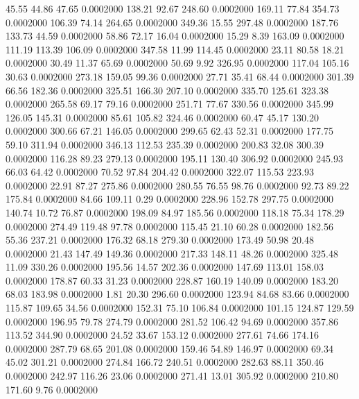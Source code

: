   45.55   44.86   47.65   0.0002000
 138.21   92.67  248.60   0.0002000
 169.11   77.84  354.73   0.0002000
 106.39   74.14  264.65   0.0002000
 349.36   15.55  297.48   0.0002000
 187.76  133.73   44.59   0.0002000
  58.86   72.17   16.04   0.0002000
  15.29    8.39  163.09   0.0002000
 111.19  113.39  106.09   0.0002000
 347.58   11.99  114.45   0.0002000
  23.11   80.58   18.21   0.0002000
  30.49   11.37   65.69   0.0002000
  50.69    9.92  326.95   0.0002000
 117.04  105.16   30.63   0.0002000
 273.18  159.05   99.36   0.0002000
  27.71   35.41   68.44   0.0002000
 301.39   66.56  182.36   0.0002000
 325.51  166.30  207.10   0.0002000
 335.70  125.61  323.38   0.0002000
 265.58   69.17   79.16   0.0002000
 251.71   77.67  330.56   0.0002000
 345.99  126.05  145.31   0.0002000
  85.61  105.82  324.46   0.0002000
  60.47   45.17  130.20   0.0002000
 300.66   67.21  146.05   0.0002000
 299.65   62.43   52.31   0.0002000
 177.75   59.10  311.94   0.0002000
 346.13  112.53  235.39   0.0002000
 200.83   32.08  300.39   0.0002000
 116.28   89.23  279.13   0.0002000
 195.11  130.40  306.92   0.0002000
 245.93   66.03   64.42   0.0002000
  70.52   97.84  204.42   0.0002000
 322.07  115.53  223.93   0.0002000
  22.91   87.27  275.86   0.0002000
 280.55   76.55   98.76   0.0002000
  92.73   89.22  175.84   0.0002000
  84.66  109.11    0.29   0.0002000
 228.96  152.78  297.75   0.0002000
 140.74   10.72   76.87   0.0002000
 198.09   84.97  185.56   0.0002000
 118.18   75.34  178.29   0.0002000
 274.49  119.48   97.78   0.0002000
 115.45   21.10   60.28   0.0002000
 182.56   55.36  237.21   0.0002000
 176.32   68.18  279.30   0.0002000
 173.49   50.98   20.48   0.0002000
  21.43  147.49  149.36   0.0002000
 217.33  148.11   48.26   0.0002000
 325.48   11.09  330.26   0.0002000
 195.56   14.57  202.36   0.0002000
 147.69  113.01  158.03   0.0002000
 178.87   60.33   31.23   0.0002000
 228.87  160.19  140.09   0.0002000
 183.20   68.03  183.98   0.0002000
   1.81   20.30  296.60   0.0002000
 123.94   84.68   83.66   0.0002000
 115.87  109.65   34.56   0.0002000
 152.31   75.10  106.84   0.0002000
 101.15  124.87  129.59   0.0002000
 196.95   79.78  274.79   0.0002000
 281.52  106.42   94.69   0.0002000
 357.86  113.52  344.90   0.0002000
  24.52   33.67  153.12   0.0002000
 277.61   74.66  174.16   0.0002000
 287.79   68.65  201.08   0.0002000
 159.46   54.89  146.97   0.0002000
  69.34   45.02  301.21   0.0002000
 274.84  166.72  240.51   0.0002000
 282.63   88.11  350.46   0.0002000
 242.97  116.26   23.06   0.0002000
 271.41   13.01  305.92   0.0002000
 210.80  171.60    9.76   0.0002000
